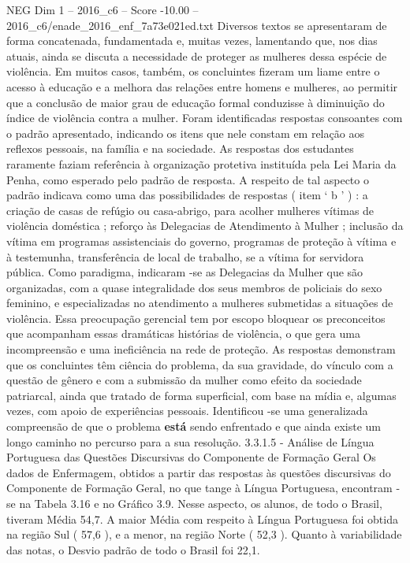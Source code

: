 \begin{textsample}{NEG Dim 1 – 2016\_c6 – Score -10.00 – 2016\_c6/enade\_2016\_enf\_7a73e021ed.txt}
Diversos textos se apresentaram de forma concatenada, fundamentada e, muitas vezes, lamentando que, nos dias atuais, ainda se discuta a necessidade de proteger as mulheres dessa espécie de violência.
Em muitos casos, também, os concluintes fizeram um liame entre o acesso à educação e a melhora das relações entre homens e mulheres, ao permitir que a conclusão de maior grau de educação formal conduzisse à diminuição do índice de violência contra a mulher.
Foram identificadas respostas consoantes com o padrão apresentado, indicando os itens que nele constam em relação aos reflexos pessoais, na família e na sociedade.
As respostas dos estudantes raramente faziam referência à organização protetiva instituída pela Lei Maria da Penha, como esperado pelo padrão de resposta.
A respeito de tal aspecto o padrão indicava como uma das possibilidades de respostas ( item ‘ b ’ ) : a criação de casas de refúgio ou casa-abrigo, para acolher mulheres vítimas de violência doméstica ; reforço às Delegacias de Atendimento à Mulher ; inclusão da vítima em programas assistenciais do governo, programas de proteção à vítima e à testemunha, transferência de local de trabalho, se a vítima for servidora pública.
Como paradigma, indicaram -se as Delegacias da Mulher que são organizadas, com a quase integralidade dos seus membros de policiais do sexo feminino, e especializadas no atendimento a mulheres submetidas a situações de violência.
Essa preocupação gerencial tem por escopo bloquear os preconceitos que acompanham essas dramáticas histórias de violência, o que gera uma incompreensão e uma ineficiência na rede de proteção.
As respostas demonstram que os concluintes têm ciência do problema, da sua gravidade, do vínculo com a questão de gênero e com a submissão da mulher como efeito da sociedade patriarcal, ainda que tratado de forma superficial, com base na mídia e, algumas vezes, com apoio de experiências pessoais.
Identificou -se uma generalizada compreensão de que o problema \textbf{está} sendo enfrentado e que ainda existe um longo caminho no percurso para a sua resolução. 3.3.1.5 - Análise de Língua Portuguesa das Questões Discursivas do Componente de Formação Geral Os dados de Enfermagem, obtidos a partir das respostas às questões discursivas do Componente de Formação Geral, no que tange à Língua Portuguesa, encontram -se na Tabela 3.16 e no Gráfico 3.9.
Nesse aspecto, os alunos, de todo o Brasil, tiveram Média 54,7.
A maior Média com respeito à Língua Portuguesa foi obtida na região Sul ( 57,6 ), e a menor, na região Norte ( 52,3 ).
Quanto à variabilidade das notas, o Desvio padrão de todo o Brasil foi 22,1.

\end{textsample}
